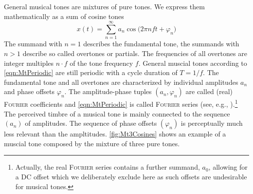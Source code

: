 \documentclass[a4paper]{article}
\newcommand\person[1]{\textsc{#1}}
\begin{document}
General musical tones are mixtures of pure tones. We express them mathematically
as a sum of cosine tones
\begin{equation}
  \label{eqn:MtPeriodic}
  x(t) 
  = \sum\limits_{n=1}^\infty a_n\cos\!\big(2\pi nft+\varphi_n)
\end{equation}
The summand with $n=1$ describes the fundamental tone, the summands with $n>1$
describe so called overtones or partials. The frequencies of all overtones are
integer multiples $n\cdot f$ of the tone frequency $f$. General muscial tones
according to \cref{eqn:MtPeriodic} are still periodic with a cycle duration of
$T=1/f$. The fundamental tone and all overtones are characterized by individual
amplitudes $a_n$ and phase offsets $\varphi_n$. The amplitude-phase tuples
$(a_n,\varphi_n)$ are called (real) \person{Fourier} coefficients and
\cref{eqn:MtPeriodic} is called \person{Fourier} series (see, e.g.,
\cite[p.\,102--113]{HW14}).\footnote{Actually, the real \person{Fourier} series
contains a further summand, $a_0$, allowing for a DC offset which we
deliberately exclude here as such offsets are undesirable for musical tones.}
The perceived timbre of a musical tone is mainly connected to the sequence
$(a_n)$ of amplitudes. The sequence of phase offsets $(\varphi_n)$ is
perceptually much less relevant than the ampltitudes. \cref{fig:Mt3Cosines}
shows an example of a muscial tone composed by the mixture of three pure tones.
\end{document}
